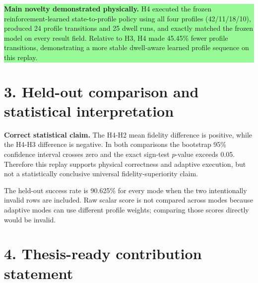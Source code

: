 \documentclass[10pt,a4paper]{article}
\newcommand{\resultbox}[2]{
  \noindent\colorbox{#1}{\parbox{0.965\linewidth}{#2}}
}
\begin{document}
\resultbox{PaleGreen}{
\textbf{Main novelty demonstrated physically.}
H4 executed the frozen reinforcement-learned state-to-profile policy
using all four profiles (42/11/18/10), produced 24 profile transitions
and 25 dwell runs, and exactly matched the frozen model on every result
field. Relative to H3, H4 made 45.45\% fewer
profile transitions, demonstrating a more stable dwell-aware learned
profile sequence on this replay.
}

\section*{3. Held-out comparison and statistical interpretation}

\begin{table}[H]
\centering
\small
{}
\caption{Paired bottleneck-fidelity comparison on the 64-row held-out
set. Positive differences favor H4.}
\end{table}

\resultbox{PaleGold}{
\textbf{Correct statistical claim.} The H4-H2 mean fidelity difference is positive, while the H4-H3 difference is negative. In both comparisons the bootstrap 95\% confidence interval crosses zero and the exact sign-test $p$-value exceeds 0.05. Therefore this replay supports physical correctness and adaptive execution, but not a statistically conclusive universal fidelity-superiority claim.
}

The held-out success rate is 90.625\% for every mode when the two
intentionally invalid rows are included. Raw scalar score is not
compared across modes because adaptive modes can use different profile
weights; comparing those scores directly would be invalid.

\section*{4. Thesis-ready contribution statement}
\end{document}
